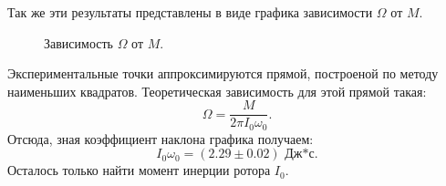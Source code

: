 \documentclass[a4paper, 12pt]{article}%
\begin{document}
Так же эти результаты представлены в виде графика зависимости $\Omega$ от $M$.

\begin{figure}[h!]
\caption{Зависимость $\Omega$ от $M$.}
\end{figure}
Экспериментальные точки аппроксимируются прямой, построеной по методу наименьших квадратов. Теоретическая зависимость для этой прямой такая:
\[\Omega=\dfrac{M}{2\pi I_0\omega_0}.\]
Отсюда, зная коэффициент наклона графика получаем:
\[I_0\omega_0=(2.29\pm0.02) \text{ Дж*с}.\]
Осталось только найти момент инерции ротора $I_0$.
\end{document}
